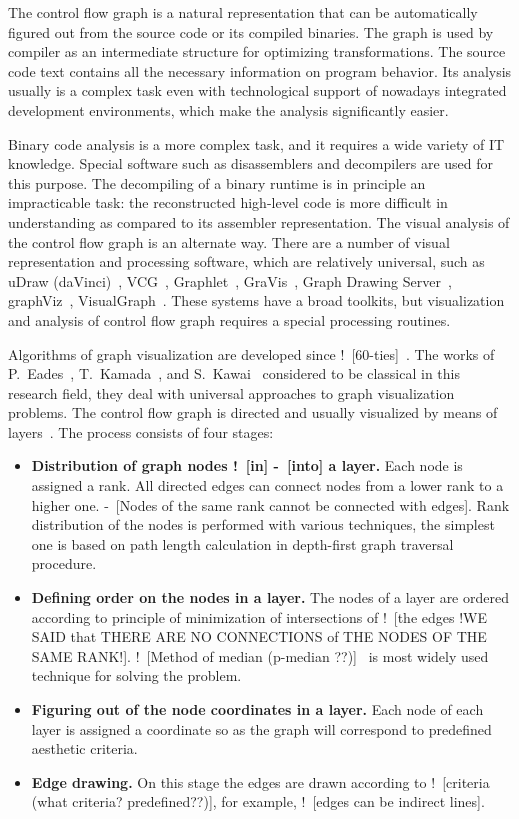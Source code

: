 \documentclass[conference]{IEEEtran}
\newcommand{\rrr}[2][rcolor]{\noindent%
\textcolor{eclr}{-\ [}\textcolor{#1}{#2}\textcolor{eclr}{]}}
\newcommand{\nnn}[2][ncolor]{\noindent%
\textcolor{eclr}{!\ [}\textcolor{#1}{#2}\textcolor{eclr}{]}}
\begin{document}
The control flow graph is a natural representation that can be automatically figured out from the source code or its compiled binaries.  The graph is used by compiler as an intermediate structure for optimizing transformations.  The source code text contains all the necessary information on program behavior.  Its analysis usually is a complex task even with technological support of nowadays integrated development environments, which make the analysis significantly easier.

Binary code analysis is a more complex task, and it requires a wide variety of IT knowledge.  Special software such as disassemblers and decompilers are used for this purpose.  The decompiling of a binary runtime is in principle an impracticable task: the reconstructed high-level code is more difficult in understanding as compared to its assembler representation.  The visual analysis of the control flow graph is an alternate way.  There are a number of visual representation and processing software, which are relatively universal, such as uDraw (daVinci)~\cite{10}, VCG~\cite{14}, Graphlet~\cite{12}, GraVis~\cite{13}, Graph Drawing Server~\cite{9}, graphViz~\cite{11}, VisualGraph~\cite{15}.  These systems have a broad toolkits, but visualization and analysis of control flow graph requires a special processing routines.

Algorithms of graph visualization are developed since \nnn{60-ties}~\cite{7}.  The works of P.~Eades~\cite{5}, T.~Kamada~\cite{q1}, and S.~Kawai~\cite{6} considered to be classical in this research field, they deal with universal approaches to graph visualization problems.  The control flow graph is directed and usually visualized by means of layers~\cite{4}.  The process consists of four stages:
\begin{itemize}
\item \textbf{Distribution of graph nodes \nnn{in}\rrr{into} a layer.} Each node is assigned a rank.  All directed edges can connect nodes from a lower rank to a higher one.  \rrr{Nodes of the same rank cannot be connected with edges}.  Rank distribution of the nodes is performed with various techniques, the simplest one is based on path length calculation in depth-first graph traversal procedure.
\item \textbf{Defining order on the nodes in a layer.} The nodes of a layer are ordered according to principle of minimization of intersections of \nnn{the edges !WE SAID that THERE ARE NO CONNECTIONS of THE NODES OF THE SAME RANK!}.  \nnn{Method of median (p-median ??)}~\cite{8} is most widely used technique for solving the problem.
\item \textbf{Figuring out of the node coordinates in a layer.} Each node of each layer is assigned a coordinate so as the graph will correspond to predefined aesthetic criteria.
\item \textbf{Edge drawing.} On this stage the edges are drawn according to \nnn{criteria (what criteria? predefined??)}, for example, \nnn{edges can be indirect lines}.
\end{itemize}
\end{document}
